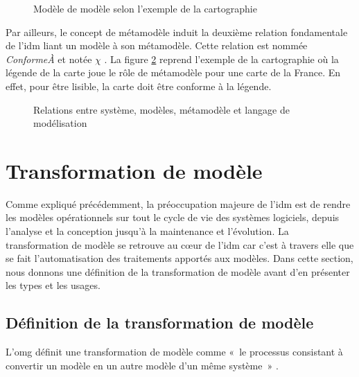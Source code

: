 \begin{figure}[!ht]
    \begin{center}
        
    \end{center}
    \caption{Modèle de modèle selon l'exemple de la cartographie 
    \protect\cite{favre2006ingenierie}}
    \label{fig:modelofmodel}
\end{figure}

Par ailleurs, le concept de métamodèle induit la deuxième relation fondamentale 
de l'\gls{idm} liant un modèle à son métamodèle. Cette relation est nommée 
\textit{ConformeÀ} et notée $\chi$ \cite{bezivin2004search} 
\cite{favre2004towards}. La figure \ref{fig:carteFavre} reprend l'exemple de la 
cartographie où la légende de la carte joue le rôle de métamodèle pour 
une carte de la France. En effet, pour être lisible, la carte doit être conforme 
à la légende.

\begin{figure}[!ht]
 \begin{center}
 
 \end{center}
 \caption{Relations entre système, modèles, métamodèle et langage de 
modélisation \protect\cite{favre2006ingenierie}}
 \label{fig:carteFavre}
\end{figure}

\section{Transformation de modèle}
Comme expliqué précédemment, la préoccupation majeure de l'\gls{idm} est de 
rendre les modèles opérationnels sur tout le cycle de vie des systèmes 
logiciels, depuis l'analyse et la conception jusqu'à la maintenance et 
l'évolution. La transformation de modèle se retrouve au cœur de l'\gls{idm} car 
c'est à travers elle que se fait l'automatisation des traitements apportés aux 
modèles. Dans cette section, nous donnons une définition de la 
transformation de modèle avant d'en présenter les types et les usages.

\subsection{Définition de la transformation de modèle}
L'\gls{omg} définit une transformation de modèle comme «~le processus consistant à 
convertir un modèle en un autre modèle d'un même système~» \cite{omg2011meta}. 

